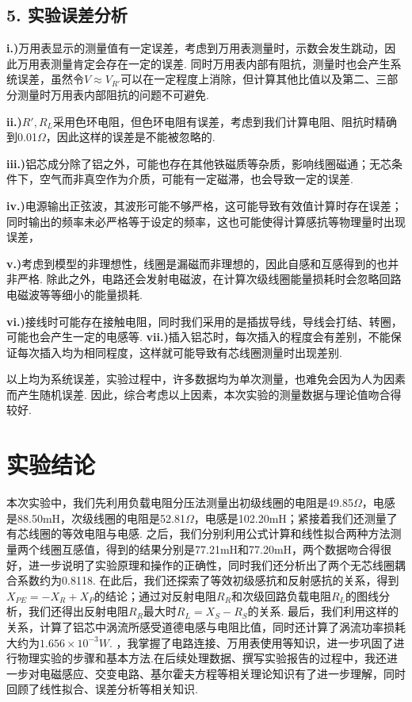 \documentclass[UTF8]{ctexart}
\begin{document}
\subsection*{5. 实验误差分析}
\textbf{i.)}万用表显示的测量值有一定误差，考虑到万用表测量时，示数会发生跳动，因此万用表测量肯定会存在一定的误差. 同时万用表内部有阻抗，测量时也会产生系统误差，虽然令$V\approx V_{R'}$可以在一定程度上消除，但计算其他比值以及第二、三部分测量时万用表内部阻抗的问题不可避免.\par
\textbf{ii.)}$R', R_L$采用色环电阻，但色环电阻有误差，考虑到我们计算电阻、阻抗时精确到0.01$\Omega$，因此这样的误差是不能被忽略的.\par
\textbf{iii.)}铝芯成分除了铝之外，可能也存在其他铁磁质等杂质，影响线圈磁通；无芯条件下，空气而非真空作为介质，可能有一定磁滞，也会导致一定的误差.\par
\textbf{iv.)}电源输出正弦波，其波形可能不够严格，这可能导致有效值计算时存在误差；同时输出的频率未必严格等于设定的频率，这也可能使得计算感抗等物理量时出现误差，\par
\textbf{v.)}考虑到模型的非理想性，线圈是漏磁而非理想的，因此自感和互感得到的也并非严格. 除此之外，电路还会发射电磁波，在计算次级线圈能量损耗时会忽略回路电磁波等等细小的能量损耗.\par
\textbf{vi.)}接线时可能存在接触电阻，同时我们采用的是插拔导线，导线会打结、转圈，可能也会产生一定的电感等.
\textbf{vii.)}插入铝芯时，每次插入的程度会有差别，不能保证每次插入均为相同程度，这样就可能导致有芯线圈测量时出现差别.\par
以上均为系统误差，实验过程中，许多数据均为单次测量，也难免会因为人为因素而产生随机误差. 因此，综合考虑以上因素，本次实验的测量数据与理论值吻合得较好.

\section{实验结论}
本次实验中，我们先利用负载电阻分压法测量出初级线圈的电阻是49.85$\Omega$，电感是88.50mH，次级线圈的电阻是52.81$\Omega$，电感是102.20mH；紧接着我们还测量了有芯线圈的等效电阻与电感. 之后，我们分别利用公式计算和线性拟合两种方法测量两个线圈互感值，得到的结果分别是77.21mH和77.20mH，两个数据吻合得很好，进一步说明了实验原理和操作的正确性，同时我们还分析出了两个无芯线圈耦合系数约为0.8118. 在此后，我们还探索了等效初级感抗和反射感抗的关系，得到$X_{PE}=-X_R+X_P$的结论；通过对反射电阻$R_R$和次级回路负载电阻$R_L$的图线分析，我们还得出反射电阻$R_R$最大时$R_L=X_S-R_S$的关系. 最后，我们利用这样的关系，计算了铝芯中涡流所感受道德电感与电阻比值，同时还计算了涡流功率损耗大约为$1.656\times 10^{-3}W$. ，我掌握了电路连接、万用表使用等知识，进一步巩固了进行物理实验的步骤和基本方法.在后续处理数据、撰写实验报告的过程中，我还进一步对电磁感应、交变电路、基尔霍夫方程等相关理论知识有了进一步理解，同时回顾了线性拟合、误差分析等相关知识.
\end{document}
